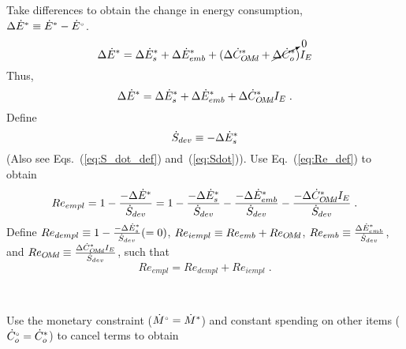 \begin{landscape}
{Take differences to obtain the change in energy consumption, \\
$\Delta {\dot{E}}^* \equiv {\dot{E}}^* - {}{\dot{E}}^{\scriptscriptstyle \circ}$.
%
\begin{equation}
  \Delta {\dot{E}}^* = \Delta {\dot{E}}^*_s
                      + \Delta {\dot{E}}^*_{emb}
                      + (\Delta {\dot{C}}^*_{O\!M\!d}
                      + \cancelto{0}{\Delta {\dot{C}}^*_o}) I_E
\end{equation}
%
Thus, 
%
\begin{equation}
\Delta {\dot{E}}^* = \Delta {\dot{E}}^*_s + \Delta {\dot{E}}^*_{emb} + \Delta {\dot{C}}^*_{O\!M\!d} I_E \; .
\end{equation}
%
Define
%
\begin{equation} \label{eq:Sdot_def}
\dot{S}_{dev} \equiv -\Delta {\dot{E}}^*_s
\end{equation}
%
(Also see Eqs.~(\ref{eq:S_dot_def}) and~(\ref{eq:Sdot})). 
Use Eq.~(\ref{eq:Re_def}) to obtain
%
\begin{equation}
Re_{empl} = 1 - \frac{-\Delta {\dot{E}}^*}{\dot{S}_{dev}} 
          = 1 - \frac{-\Delta {\dot{E}}^*_s}{\dot{S}_{dev}} 
              - \frac{-\Delta {\dot{E}}^*_{emb}}{\dot{S}_{dev}}
              - \frac{-\Delta {\dot{C}}^*_{O\!M\!d} I_E}{\dot{S}_{dev}} \; .
\end{equation}
%
Define $Re_{dempl} \equiv 1 - \frac{-\Delta {\dot{E}}^*_s}{\dot{S}_{dev}} (= 0)$, 
$Re_{iempl} \equiv Re_{emb} + Re_{O\!M\!d}$, 
$Re_{emb} \equiv \frac{\Delta {\dot{E}}^*_{emb}}{\dot{S}_{dev}}$, and
$Re_{O\!M\!d} \equiv \frac{\Delta {\dot{C}}^*_{O\!M\!d} I_E}{\dot{S}_{dev}}$, 
such that
%
\begin{equation} \label{eq:Re_empl_def}
Re_{empl} = Re_{dempl} + Re_{iempl} \; .
\end{equation}
}
{
~
    
Use the monetary constraint (${}{\dot{M}}^{\scriptscriptstyle \circ} = {\dot{M}}^*$)
and constant spending on other items (${}{\dot{C}}^{\scriptscriptstyle \circ}_o = {\dot{C}}^*_o$) to cancel terms to obtain

}
\end{landscape}
